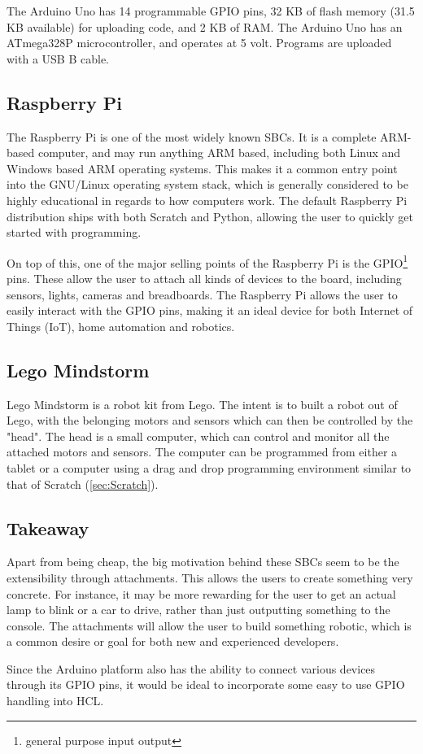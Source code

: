 The Arduino Uno has 14 programmable GPIO pins, 32 KB of flash memory (31.5 KB available) for uploading code, and 2 KB of RAM.
The Arduino Uno has an ATmega328P microcontroller, and operates at 5 volt.
Programs are uploaded with a USB B cable.

\subsection{Raspberry Pi}
The Raspberry Pi is one of the most widely known SBCs. 
It is a complete ARM-based computer, and may run anything ARM based, including both Linux and Windows based ARM operating systems. 
This makes it a common entry point into the GNU/Linux operating system stack, which is generally considered to be highly educational in regards to how computers work.
The default Raspberry Pi distribution ships with both Scratch and Python, allowing the user to quickly get started with programming\cite{RaspberryPi}.

On top of this, one of the major selling points of the Raspberry Pi is the GPIO\footnote{general purpose input output} pins. 
These allow the user to attach all kinds of devices to the board, including sensors, lights, cameras and breadboards. 
The Raspberry Pi allows the user to easily interact with the GPIO pins, making it an ideal device for both Internet of Things (IoT), home automation and robotics\cite{RaspberryPi}.

\subsection{Lego Mindstorm}
Lego Mindstorm is a robot kit from Lego. 
The intent is to built a robot out of Lego, with the belonging motors and sensors which can then be controlled by the "head". 
The head is a small computer, which can control and monitor all the attached motors and sensors. 
The computer can be programmed from either a tablet or a computer using a drag and drop programming environment similar to that of Scratch (\ref{sec:Scratch})\cite{LegoMindstorms}.

\subsection{Takeaway}
Apart from being cheap, the big motivation behind these SBCs seem to be the extensibility through attachments. 
This allows the users to create something very concrete. 
For instance, it may be more rewarding for the user to get an actual lamp to blink or a car to drive, rather than just outputting something to the console. 
The attachments will allow the user to build something robotic, which is a common desire or goal for both new and experienced developers\cite{EducationalRobotics}.

Since the Arduino platform also has the ability to connect various devices through its GPIO pins, it would be ideal to incorporate some easy to use GPIO handling into HCL.
